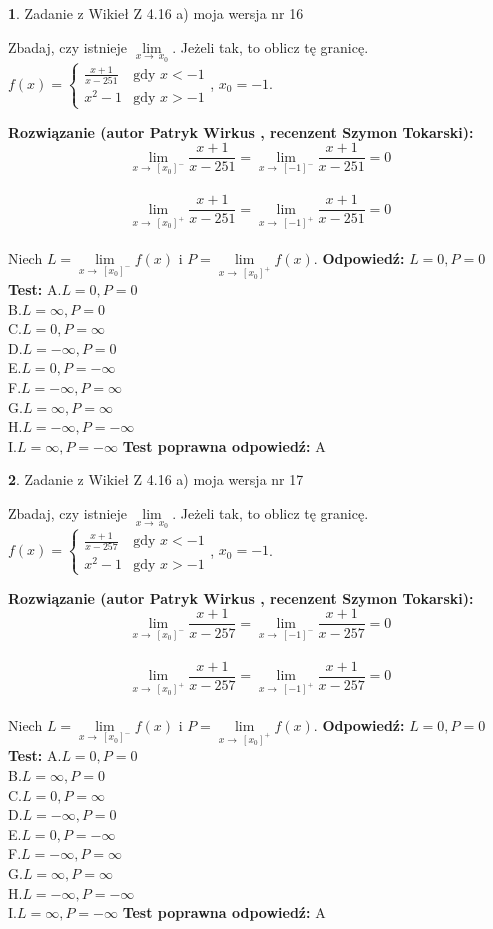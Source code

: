 \documentclass[12pt, a4paper]{article}
\theoremstyle{definition} %
\newtheorem{zad}{}
\newcommand{\zadStart}[1]{\begin{zad}#1\newline}
\newcommand{\zadStop}{\end{zad}}
\newcommand{\rozwStart}[2]{\noindent \textbf{Rozwiązanie (autor #1 , recenzent #2): }\newline}
\newcommand{\rozwStop}{\newline}
\newcommand{\odpStart}{\noindent \textbf{Odpowiedź:}\newline}
\newcommand{\odpStop}{\newline}
\newcommand{\testStart}{\noindent \textbf{Test:}\newline}
\newcommand{\testStop}{\newline}
\newcommand{\kluczStart}{\noindent \textbf{Test poprawna odpowiedź:}\newline}
\newcommand{\kluczStop}{\newline}
\begin{document}
\zadStart{Zadanie z Wikieł Z 4.16 a) moja wersja nr 16}

Zbadaj, czy istnieje $\lim\limits_{x\to\ x_{0}}$. Jeżeli tak, to oblicz tę granicę.\\   $f(x) = \left\{ \begin{array}{ll}
\frac{x+1}{x-251} & \textrm{gdy $x<-1$}\\
x^{2}-1 & \textrm{gdy $x>-1$}
\end{array} \right.$, $x_{0}=-1$.
\zadStop
\rozwStart{Patryk Wirkus}{Szymon Tokarski}
$$\lim\limits_{x\to\ [x_{0}]^{-}}\frac{x+1}{x-251} = \lim\limits_{x\to\ [-1]^{-}}\frac{x+1}{x-251} = 0$$
\\
$$\lim\limits_{x\to\ [x_{0}]^{+}}\frac{x+1}{x-251} = \lim\limits_{x\to\ [-1]^{+}}\frac{x+1}{x-251} = 0$$
\\
Niech $L=\lim\limits_{x\to\ [x_{0}]^{-}}f(x)$ i $P=\lim\limits_{x\to\ [x_{0}]^{+}}f(x)$.
\rozwStop
\odpStart
$L=0, P=0$
\odpStop
\testStart
A.$L=0, P=0$\\ B.$L=\infty, P=0$\\ C.$L=0, P=\infty$\\ D.$L=-\infty, P=0$\\ E.$L=0, P=-\infty$\\
F.$L=-\infty, P=\infty$\\ G.$L=\infty, P=\infty$\\
H.$L=-\infty, P=-\infty$\\
I.$L=\infty, P=-\infty$
\testStop
\kluczStart
A
\kluczStop



\zadStart{Zadanie z Wikieł Z 4.16 a) moja wersja nr 17}

Zbadaj, czy istnieje $\lim\limits_{x\to\ x_{0}}$. Jeżeli tak, to oblicz tę granicę.\\   $f(x) = \left\{ \begin{array}{ll}
\frac{x+1}{x-257} & \textrm{gdy $x<-1$}\\
x^{2}-1 & \textrm{gdy $x>-1$}
\end{array} \right.$, $x_{0}=-1$.
\zadStop
\rozwStart{Patryk Wirkus}{Szymon Tokarski}
$$\lim\limits_{x\to\ [x_{0}]^{-}}\frac{x+1}{x-257} = \lim\limits_{x\to\ [-1]^{-}}\frac{x+1}{x-257} = 0$$
\\
$$\lim\limits_{x\to\ [x_{0}]^{+}}\frac{x+1}{x-257} = \lim\limits_{x\to\ [-1]^{+}}\frac{x+1}{x-257} = 0$$
\\
Niech $L=\lim\limits_{x\to\ [x_{0}]^{-}}f(x)$ i $P=\lim\limits_{x\to\ [x_{0}]^{+}}f(x)$.
\rozwStop
\odpStart
$L=0, P=0$
\odpStop
\testStart
A.$L=0, P=0$\\ B.$L=\infty, P=0$\\ C.$L=0, P=\infty$\\ D.$L=-\infty, P=0$\\ E.$L=0, P=-\infty$\\
F.$L=-\infty, P=\infty$\\ G.$L=\infty, P=\infty$\\
H.$L=-\infty, P=-\infty$\\
I.$L=\infty, P=-\infty$
\testStop
\kluczStart
A
\kluczStop
\end{document}
